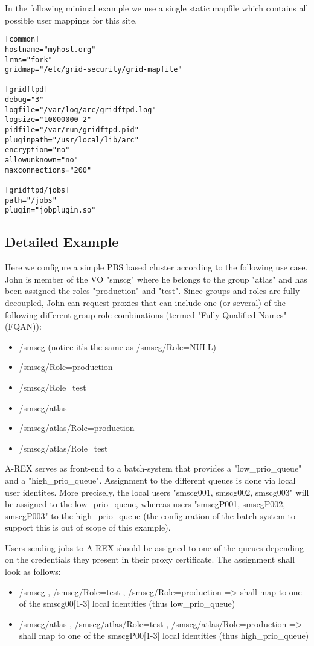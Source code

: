 \documentclass{article}
\begin{document}
In the following minimal example we use a single static mapfile which
contains all possible user mappings for this site.

\begin{verbatim}
[common]
hostname="myhost.org"
lrms="fork"
gridmap="/etc/grid-security/grid-mapfile"

[gridftpd]
debug="3"
logfile="/var/log/arc/gridftpd.log"
logsize="10000000 2"
pidfile="/var/run/gridftpd.pid"
pluginpath="/usr/local/lib/arc"
encryption="no"
allowunknown="no"
maxconnections="200"

[gridftpd/jobs]
path="/jobs"
plugin="jobplugin.so"
\end{verbatim}


\subsection{Detailed Example}

Here we configure a simple PBS based cluster according to the
following use case.  John is member of the VO "smscg" where he belongs
to the group "atlas" and has been assigned the roles "production" and
"test". Since groups and roles are fully decoupled, John can request
proxies that can include one (or several) of the following different
group-role combinations (termed "Fully Qualified Names" (FQAN)):
\begin{itemize}
\item /smscg (notice it's the same as /smscg/Role=NULL)
\item /smscg/Role=production
\item /smscg/Role=test
\item /smscg/atlas
\item /smscg/atlas/Role=production
\item /smscg/atlas/Role=test
\end{itemize}

A-REX serves as front-end to a batch-system that provides a
"low\_prio\_queue" and a "high\_prio\_queue". Assignment to the
different queues is done via local user identites.  More precisely,
the local users "smscg001, smscg002, smscg003" will be assigned to the
low\_prio\_queue, whereas users "smscgP001, smscgP002, smscgP003" to
the high\_prio\_queue (the configuration of the batch-system to support
this is out of scope of this example).

Users sending jobs to A-REX should be assigned to one of the queues
depending on the credentials they present in their proxy
certificate. The assignment shall look as follows:
\begin{itemize}
\item /smscg , /smscg/Role=test , /smscg/Role=production => shall map
  to one of the smscg00[1-3] local identities (thus low\_prio\_queue)
\item /smscg/atlas , /smscg/atlas/Role=test ,
  /smscg/atlas/Role=production => shall map to one of the
  smscgP00[1-3] local identities (thus high\_prio\_queue)
\end{itemize}
\end{document}
